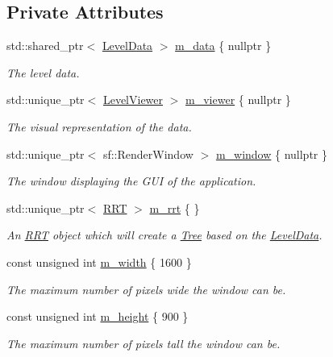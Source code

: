 \subsection*{Private Attributes}
\begin{DoxyCompactItemize}
\item 
std\+::shared\+\_\+ptr$<$ \hyperlink{classLevelData}{Level\+Data} $>$ \hyperlink{classRRTDemo_a74d34da51c590f616e41c1d971e2713e}{m\+\_\+data} \{ nullptr \}
\begin{DoxyCompactList}\small\item\em The level data. \end{DoxyCompactList}\item 
std\+::unique\+\_\+ptr$<$ \hyperlink{classLevelViewer}{Level\+Viewer} $>$ \hyperlink{classRRTDemo_adcef94ca094608569dbd8478b65fad08}{m\+\_\+viewer} \{ nullptr \}
\begin{DoxyCompactList}\small\item\em The visual representation of the data. \end{DoxyCompactList}\item 
std\+::unique\+\_\+ptr$<$ sf\+::\+Render\+Window $>$ \hyperlink{classRRTDemo_aedde8ecc0fa074bab8c7a4d34c45c0de}{m\+\_\+window} \{ nullptr \}
\begin{DoxyCompactList}\small\item\em The window displaying the G\+U\+I of the application. \end{DoxyCompactList}\item 
std\+::unique\+\_\+ptr$<$ \hyperlink{classRRT}{R\+R\+T} $>$ \hyperlink{classRRTDemo_ae2cc9c4a77e79e09d2b0fa0dcde114c5}{m\+\_\+rrt} \{ \}
\begin{DoxyCompactList}\small\item\em An \hyperlink{classRRT}{R\+R\+T} object which will create a \hyperlink{classTree}{Tree} based on the \hyperlink{classLevelData}{Level\+Data}. \end{DoxyCompactList}\item 
const unsigned int \hyperlink{classRRTDemo_ae4c5cf25ec52db70003a96ebd0f81c62}{m\+\_\+width} \{ 1600 \}
\begin{DoxyCompactList}\small\item\em The maximum number of pixels wide the window can be. \end{DoxyCompactList}\item 
const unsigned int \hyperlink{classRRTDemo_aa9ace790edf95dc62c2b77e3ba5e567b}{m\+\_\+height} \{ 900 \}
\begin{DoxyCompactList}\small\item\em The maximum number of pixels tall the window can be. \end{DoxyCompactList}\item 

\end{DoxyCompactItemize}
